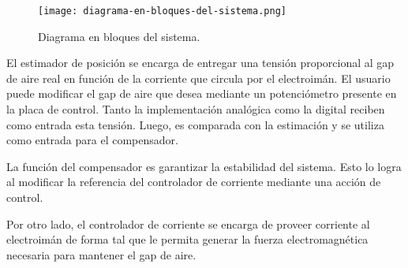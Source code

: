 \begin{figure}[H]
	\centering
	\texttt{[image: diagrama-en-bloques-del-sistema.png]}
	\caption{Diagrama en bloques del sistema.}
	\label{fig:img_diagrama-en-bloques-del-sistema}
\end{figure}

\noindent El estimador de posición se encarga de entregar una tensión proporcional al gap de aire real en función de la corriente que circula por el electroimán. El usuario puede modificar el gap de aire que desea mediante un potenciómetro presente en la placa de control. Tanto la implementación analógica como la digital reciben como entrada esta tensión. Luego, es comparada con la estimación y se utiliza como entrada para el compensador.

\noindent La función del compensador es garantizar la estabilidad del sistema. Esto lo logra al modificar la referencia del controlador de corriente mediante una acción de control. 

\noindent Por otro lado, el controlador de corriente se encarga de proveer corriente al electroimán de forma tal que le permita generar la fuerza electromagnética necesaria para mantener el gap de aire.
 